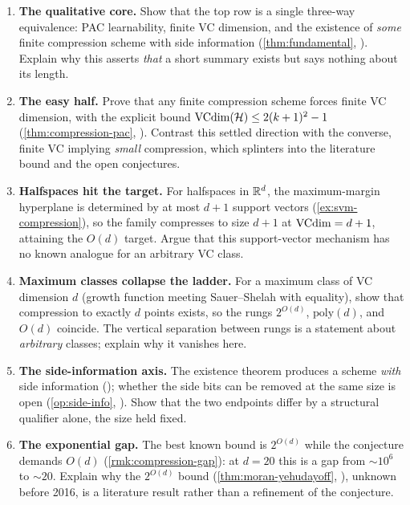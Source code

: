 \begin{enumerate}[leftmargin=*,itemsep=3pt]
\item \textbf{The qualitative core.} Show that the top row is a single three-way equivalence: PAC learnability, finite VC dimension, and the existence of \emph{some} finite compression scheme with side information (\cref{thm:fundamental}, ). Explain why this asserts \emph{that} a short summary exists but says nothing about its length.

\item \textbf{The easy half.} Prove that any finite compression scheme forces finite VC dimension, with the explicit bound $\mathrm{VCdim}(\mathcal{H}) \le 2(k+1)^2-1$ (\cref{thm:compression-pac}, ). Contrast this settled direction with the converse, finite VC implying \emph{small} compression, which splinters into the literature bound and the open conjectures.

\item \textbf{Halfspaces hit the target.} For halfspaces in $\mathbb{R}^d$, the maximum-margin hyperplane is determined by at most $d+1$ support vectors (\cref{ex:svm-compression}), so the family compresses to size $d+1$ at $\mathrm{VCdim}=d+1$, attaining the $O(d)$ target. Argue that this support-vector mechanism has no known analogue for an arbitrary VC class.

\item \textbf{Maximum classes collapse the ladder.} For a maximum class of VC dimension $d$ (growth function meeting Sauer--Shelah with equality), show that compression to exactly $d$ points exists, so the rungs $2^{O(d)}$, $\mathrm{poly}(d)$, and $O(d)$ coincide. The vertical separation between rungs is a statement about \emph{arbitrary} classes; explain why it vanishes here.

\item \textbf{The side-information axis.} The existence theorem produces a scheme \emph{with} side information (); whether the side bits can be removed at the same size is open (\cref{op:side-info}, ). Show that the two endpoints differ by a structural qualifier alone, the size held fixed.

\item \textbf{The exponential gap.} The best known bound is $2^{O(d)}$ while the conjecture demands $O(d)$ (\cref{rmk:compression-gap}): at $d=20$ this is a gap from $\sim 10^6$ to $\sim 20$. Explain why the $2^{O(d)}$ bound (\cref{thm:moran-yehudayoff}, \cite{MoranYehudayoff2016}), unknown before 2016, is a literature result rather than a refinement of the conjecture.


\end{enumerate}
